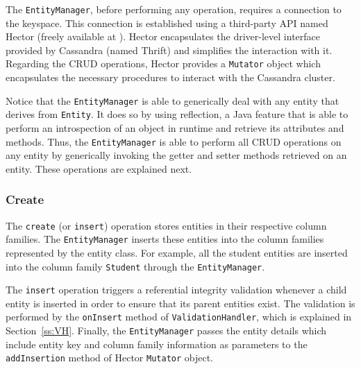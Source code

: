 	The \texttt{EntityManager},  before performing any operation,  requires a
	connection to the keyspace.  This connection is established using a third-party
	\ac{API} named Hector (freely available at ).  Hector
	 encapsulates the driver-level interface provided by Cassandra (named Thrift) 
	 and simplifies the interaction with it.  Regarding the \ac{CRUD} 
	 operations,  Hector provides  a \texttt{Mutator} object which encapsulates the
	 necessary procedures to interact with the Cassandra cluster.     
	 
	 Notice that  the \texttt{EntityManager} is able to generically deal with any
	 entity that derives from \texttt{Entity}.  It does so by using
	 reflection,  a Java  feature that is able to perform an introspection of an
	 object in runtime and retrieve its attributes and methods. 
	 Thus,  the  \texttt{EntityManager} is able to perform all \ac{CRUD} operations
	 on any entity by generically invoking the getter and setter methods
	 retrieved on an entity. 
	 These operations are explained next. 
	 
	 
	
	
	
	
	
		\subsubsection{Create}
		The \texttt{create} (or \texttt{insert}) operation stores entities in their
		respective column families.  The \texttt{EntityManager} inserts these entities
		into the column families represented by the entity class.   
		For example, all the student entities are inserted into the column family
		\texttt{Student} through the \texttt{EntityManager}.  
		
		The \texttt{insert} operation triggers a referential integrity validation
		whenever a child entity is  inserted in order to ensure that its parent entities
		exist.  The validation is performed by the \texttt{onInsert} method of
		\texttt{ValidationHandler},  which is explained in Section~\ref{ss:VH}.  Finally, 
		the \texttt{EntityManager} passes the entity details which include entity key
		and column family information as parameters to the \texttt{addInsertion} method
		of Hector \texttt{Mutator} object. 
			
